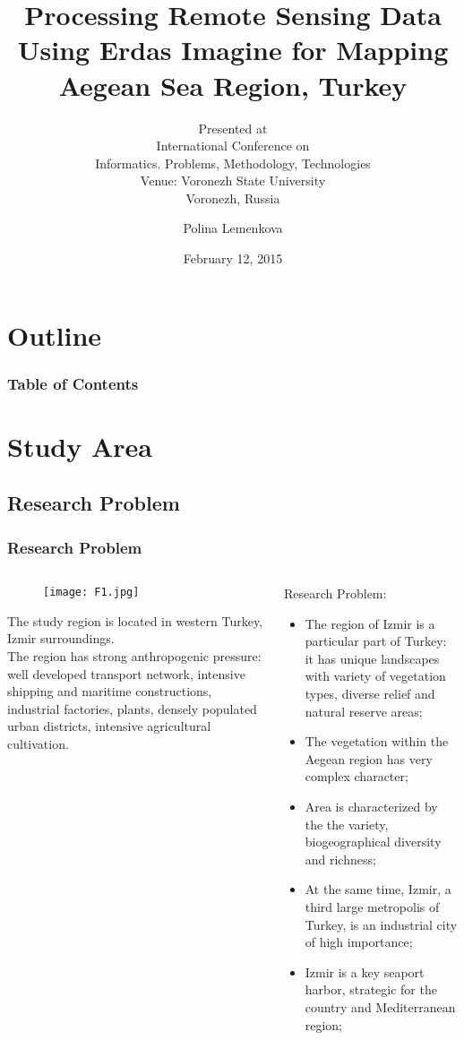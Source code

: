 \documentclass[pdflatex,compress,8pt,
	xcolor={dvipsnames,dvipsnames,svgnames,x11names,table},
	hyperref={
	breaklinks = true, 
	pdfauthor={Lemenkova Polina}, 
	pdfsubject={Preentation}, 
	pdfcreator={Lemenkova Polina}, 
	pdfproducer={Lemenkova Polina}, 
	citecolor=NavyBlue, 
	urlbordercolor=cyan,
	urlcolor = NavyBlue, 
	breaklinks = true}]{beamer}
\title{Processing Remote Sensing Data Using Erdas Imagine for Mapping Aegean Sea Region, Turkey}
\subtitle{Presented at \\
\nth{15} International Conference on \\
Informatics. Problems, Methodology, Technologies\\
Venue: Voronezh State University\\ 
Voronezh, Russia}
\author{Polina Lemenkova}
\date{February 12, 2015}
\begin{document}
\begin{frame}
           \titlepage
\end{frame}

\section*{Outline}
 \begin{frame}\frametitle{Table of Contents}
           \tableofcontents
\end{frame}

\section{Study Area}
\subsection{Research Problem}
\begin{frame}\frametitle{Research Problem}
\begin{minipage}[0.4\textheight]{\textwidth}
\begin{columns}[T]
\begin{column}{0.5\textwidth}
\vspace{2em}
\begin{figure}[H]
	\centering
		\texttt{[image: F1.jpg]}
\end{figure}
\small{The study region is located in western Turkey, Izmir surroundings. \\
The region has strong anthropogenic pressure: well developed transport network, intensive shipping and maritime constructions, industrial factories, plants, densely populated urban districts, intensive agricultural cultivation.
}
\end{column}
\begin{column}{0.5\textwidth}
\vspace{2em} 
Research Problem: 
\begin{itemize}
	\item The region of Izmir is a particular part of Turkey: it has unique landscapes with variety of vegetation types, diverse relief and natural reserve areas;
	\item The vegetation within the Aegean region has very complex character;
	\item Area is characterized by the the variety, biogeographical diversity and richness;
	\item At the same time, Izmir, a third large metropolis of Turkey, is an industrial city of high importance;
	\item Izmir is a key seaport harbor, strategic for the country and Mediterranean region;
\end{itemize}
\end{column}
\end{columns}
\end{minipage}
\end{frame}
\end{document}
